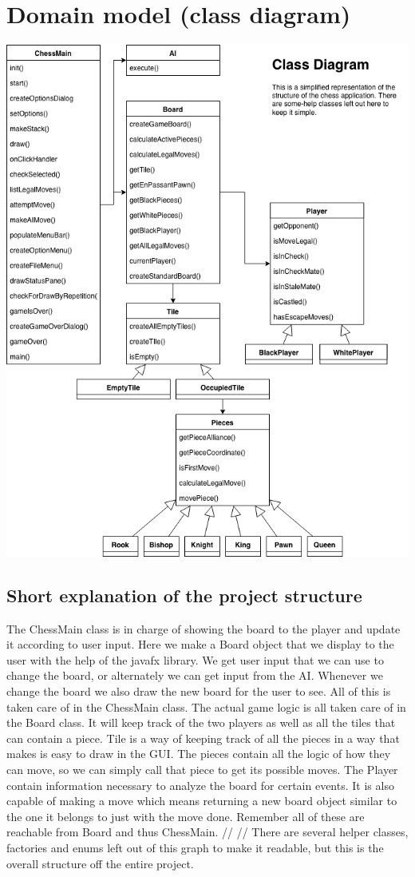 \documentclass{article}
\begin{document}
    \section{Domain model (class diagram)}
    \includegraphics[scale=0.35]{class-diagram.png}
    
    \subsection{Short explanation of the project structure}
    	The ChessMain class is in charge of showing the board to the player and update it according to user input.
	Here we make a Board object that we display to the user with the help of the javafx library.
	We get user input that we can use to change the board, or alternately we can get input from the AI.
	Whenever we change the board we also draw the new board for the user to see. 
	All of this is taken care of in the ChessMain class.
	The actual game logic is all taken care of in the Board class.
	It will keep track of the two players as well as all the tiles that can contain a piece.
	Tile is a way of keeping track of all the pieces in a way that makes is easy to draw in the GUI.
	The pieces contain all the logic of how they can move,
	so we can simply call that piece to get its possible moves.
	The Player contain information necessary to analyze the board for certain events.
	It is also capable of making a move 
	which means returning a new board object similar to the one it belongs to just with the move done.
	Remember all of these are reachable from Board and thus ChessMain.
	// //
There are several helper classes, factories and enums left out of this graph to make it readable, but this is the overall structure off the entire project. 

    

    
\end{document}
